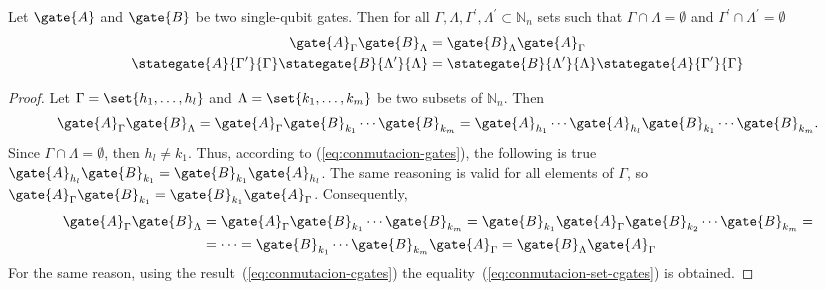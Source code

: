 \documentclass[sigconf,natbib=false]{acmart}
\begin{document}
\begin{proposition}
	Let $\gate{A}$ and $\gate{B}$ be two single-qubit gates.
	Then for all $\Gamma, \Lambda, \Gamma^\prime, \Lambda^\prime \subset \mathbb{N}_n$ sets such that $\Gamma\cap\Lambda=\emptyset$ and $\Gamma^\prime\cap\Lambda^\prime=\emptyset$
	\begin{align}
		\label{eq:conmutacion-set-gates}
		\gate{A}_{\Gamma}\gate{B}_{\Lambda} &= \gate{B}_{\Lambda}\gate{A}_{\Gamma}\\
		\label{eq:conmutacion-set-cgates}
		\stategate{A}{\Gamma^\prime}{\Gamma}\stategate{B}{\Lambda^\prime}{\Lambda} &= \stategate{B}{\Lambda^\prime}{\Lambda}\stategate{A}{\Gamma^\prime}{\Gamma}
	\end{align}
\end{proposition}
\begin{proof}
Let $\Gamma=\set{h_1,\dots,h_l}$ and $\Lambda=\set{k_1,\dots,k_m}$ be two subsets of $\mathbb{N}_n$. Then
\begin{align*}
\gate{A}_{\Gamma}\gate{B}_{\Lambda}=\gate{A}_{\Gamma}\gate{B}_{k_1}\cdots\gate{B}_{k_m}=\gate{A}_{h_1}\cdots\gate{A}_{h_l}\gate{B}_{k_1}\cdots\gate{B}_{k_m}.
\end{align*}
	Since $\Gamma\cap\Lambda=\emptyset$, then $h_l\neq k_1$.
	Thus, according to (\ref{eq:conmutacion-gates}), the following is true $\gate{A}_{h_l}\gate{B}_{k_1}=\gate{B}_{k_1}\gate{A}_{h_l}$.
The same reasoning is valid for all elements of $\Gamma$, so $\gate{A}_{\Gamma}\gate{B}_{k_1}=\gate{B}_{k_1}\gate{A}_{\Gamma}$. Consequently,
\begin{align*}
\gate{A}_{\Gamma}\gate{B}_{\Lambda}&=\gate{A}_{\Gamma}\gate{B}_{k_1}\cdots\gate{B}_{k_m}=\gate{B}_{k_1}\gate{A}_{\Gamma}\gate{B}_{k_2}\cdots\gate{B}_{k_m}=\\
&=\dots = \gate{B}_{k_1}\cdots\gate{B}_{k_m}\gate{A}_{\Gamma}=\gate{B}_{\Lambda}\gate{A}_{\Gamma}
\end{align*}
	 For the same reason, using the result~(\ref{eq:conmutacion-cgates}) the equality~(\ref{eq:conmutacion-set-cgates}) is obtained.
\end{proof}
\end{document}
